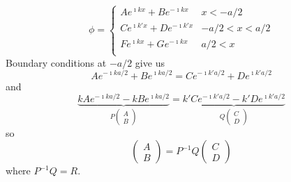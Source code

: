 \documentclass[a4paper,twoside,master.tex]{subfiles}
\begin{document}
\begin{equation}
    \phi = \begin{cases}
        A e^{\imath k x} + B e^{-\imath k x}& x < -a/2\\
        C e^{\imath k'x} + D e^{-\imath k'x}& -a/2 < x < a/2\\
        F e^{\imath k x} + G e^{-\imath k x}& a/2 < x\\
    \end{cases}
\end{equation}
Boundary conditions at $ -a/2 $ give us
\begin{equation}
    A e^{-\imath ka/2} + B e^{\imath ka/2} = C e^{-\imath k'a/2} + D e^{\imath k'a/2}
\end{equation}
and
\begin{equation}
    \underbrace{kA e^{-\imath ka/2} - kB e^{\imath ka/2}}_{P\begin{pmatrix}A\\B\end{pmatrix}} = \underbrace{k'C e^{-\imath k'a/2} - k'D e^{\imath k'a/2}}_{Q\begin{pmatrix}C\\D\end{pmatrix}}
\end{equation}
so
\begin{equation}
    \begin{pmatrix}A\\B\end{pmatrix} = P^{-1}Q\begin{pmatrix}C\\D\end{pmatrix}
\end{equation}
where $ P^{-1}Q = R $.
\end{document}
